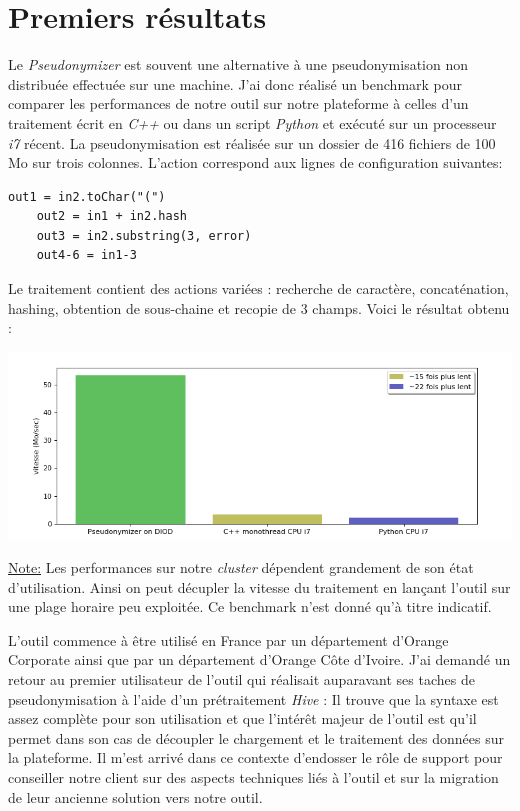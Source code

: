 \documentclass[12pt]{report}
\begin{document}
	\section{Premiers résultats}
	Le \textit{Pseudonymizer} est souvent une alternative à une pseudonymisation non distribuée effectuée sur une machine. J'ai donc réalisé un benchmark pour comparer les performances de notre outil sur notre plateforme à celles d'un traitement écrit en \textit{C++} ou dans un script \textit{Python} et exécuté sur un processeur \textit{i7} récent. La pseudonymisation est réalisée sur un dossier de 416 fichiers de 100 Mo sur trois colonnes. L'action correspond aux lignes de configuration suivantes:
	\begin{lstlisting}[style=config]
	out1 = in2.toChar("(")
	out2 = in1 + in2.hash
	out3 = in2.substring(3, error)
	out4-6 = in1-3 
	\end{lstlisting}
	Le traitement contient des actions variées : recherche de caractère, concaténation, hashing, obtention de sous-chaine et recopie de 3 champs. Voici le résultat obtenu :
	\begin{center}
		\includegraphics[scale=0.6]{bench.png}
	\end{center}
\underline{Note:} Les performances sur notre \textit{cluster} dépendent grandement de son état d'utilisation. Ainsi on peut décupler la vitesse du traitement en lançant l'outil sur une plage horaire peu exploitée. Ce benchmark n'est donné qu'à titre indicatif.
	
	L'outil commence à être utilisé en France par un département d'Orange Corporate ainsi que par un département d'Orange Côte d'Ivoire. J'ai demandé un retour au premier utilisateur de l'outil qui réalisait auparavant ses taches de pseudonymisation à l'aide d'un prétraitement \textit{Hive} : Il trouve que la syntaxe est assez complète pour son utilisation et que l’intérêt majeur de l'outil est qu'il permet dans son cas de découpler le chargement et le traitement des données sur la plateforme. \newline
	Il m'est arrivé dans ce contexte d'endosser le rôle de support pour conseiller notre client sur des aspects techniques liés à l'outil et sur la migration de leur ancienne solution vers notre outil.
\end{document}
